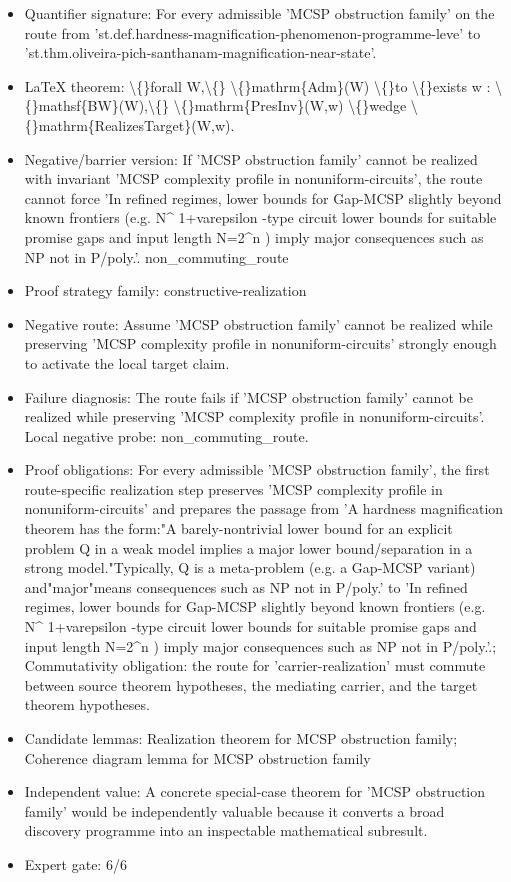 \documentclass[11pt]{article}
\begin{document}
\begin{itemize}
\item Quantifier signature: For every admissible 'MCSP obstruction family' on the route from 'st.def.hardness-magnification-phenomenon-programme-leve' to 'st.thm.oliveira-pich-santhanam-magnification-near-state'.
\item LaTeX theorem: \textbackslash\{\}forall W,\textbackslash\{\} \textbackslash\{\}mathrm\{Adm\}(W) \textbackslash\{\}to \textbackslash\{\}exists w : \textbackslash\{\}mathsf\{BW\}(W),\textbackslash\{\} \textbackslash\{\}mathrm\{PresInv\}(W,w) \textbackslash\{\}wedge \textbackslash\{\}mathrm\{RealizesTarget\}(W,w).
\item Negative/barrier version: If 'MCSP obstruction family' cannot be realized with invariant 'MCSP complexity profile in nonuniform-circuits', the route cannot force 'In refined regimes, lower bounds for Gap-MCSP slightly beyond known frontiers (e.g. N\textasciicircum{} 1+varepsilon -type circuit lower bounds for suitable promise gaps and input length N=2\textasciicircum{}n ) imply major consequences such as NP not in P/poly.'. non\_commuting\_route
\item Proof strategy family: constructive-realization
\item Negative route: Assume 'MCSP obstruction family' cannot be realized while preserving 'MCSP complexity profile in nonuniform-circuits' strongly enough to activate the local target claim.
\item Failure diagnosis: The route fails if 'MCSP obstruction family' cannot be realized while preserving 'MCSP complexity profile in nonuniform-circuits'. Local negative probe: non\_commuting\_route.
\item Proof obligations: For every admissible 'MCSP obstruction family', the first route-specific realization step preserves 'MCSP complexity profile in nonuniform-circuits' and prepares the passage from 'A hardness magnification theorem has the form:"A barely-nontrivial lower bound for an explicit problem Q in a weak model implies a major lower bound/separation in a strong model."Typically, Q is a meta-problem (e.g. a Gap-MCSP variant) and"major"means consequences such as NP not in P/poly.' to 'In refined regimes, lower bounds for Gap-MCSP slightly beyond known frontiers (e.g. N\textasciicircum{} 1+varepsilon -type circuit lower bounds for suitable promise gaps and input length N=2\textasciicircum{}n ) imply major consequences such as NP not in P/poly.'.; Commutativity obligation: the route for 'carrier-realization' must commute between source theorem hypotheses, the mediating carrier, and the target theorem hypotheses.
\item Candidate lemmas: Realization theorem for MCSP obstruction family; Coherence diagram lemma for MCSP obstruction family
\item Independent value: A concrete special-case theorem for 'MCSP obstruction family' would be independently valuable because it converts a broad discovery programme into an inspectable mathematical subresult.
\item Expert gate: 6/6
\end{itemize}
\end{document}
